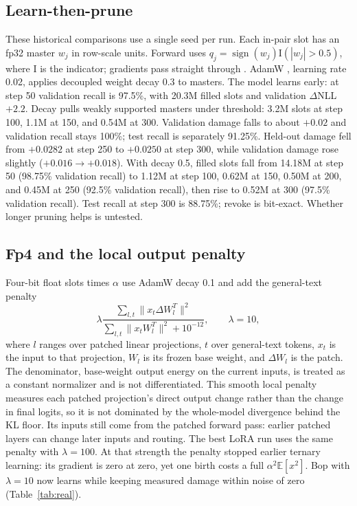 \documentclass[11pt]{article}
\begin{document}
\subsection{Learn-then-prune} These historical comparisons use a single seed per run. Each in-pair slot has an fp32 master $w_j$ in row-scale units. Forward uses
$q_j=\operatorname{sign}(w_j)\mathrm{I}(|w_j|>0.5)$, where $\mathrm{I}$ is the indicator; gradients pass straight through
\citep{ste}. AdamW \citep{adamw}, learning rate 0.02, applies decoupled weight decay 0.3 to masters.
The model learns early: at step 50 validation recall is 97.5\%, with 20.3M filled slots and validation
$\Delta$NLL $+2.2$. Decay pulls weakly supported masters under threshold: 3.2M slots at step 100,
1.1M at 150, and 0.54M at 300. Validation damage falls to about $+0.02$ and validation recall stays
100\%; test recall is separately 91.25\%. Held-out damage fell from $+0.0282$ at step 250 to
$+0.0250$ at step 300, while validation damage rose slightly ($+0.016 \to +0.018$).
With decay 0.5, filled slots fall from 14.18M at step 50 (98.75\% validation recall)
to 1.12M at step 100, 0.62M at 150, 0.50M at 200, and 0.45M at 250 (92.5\% validation recall),
then rise to 0.52M at 300 (97.5\% validation recall). Test recall at step 300 is 88.75\%;
revoke is bit-exact. Whether longer pruning helps is untested.
\par

\subsection{Fp4 and the local output penalty} Four-bit float slots times $\alpha$ use AdamW decay 0.1
and add the general-text penalty
\[
\lambda\frac{\sum_{l,t}\|x_t\Delta W_l^T\|^2}{\sum_{l,t}\|x_tW_l^T\|^2+10^{-12}},\qquad\lambda=10,
\]
where $l$ ranges over patched linear projections, $t$ over general-text tokens, $x_t$ is the input to
that projection, $W_l$ is its frozen base weight, and $\Delta W_l$ is the patch. The denominator,
base-weight output energy on the current inputs, is treated as a constant normalizer and is not
differentiated. This smooth local
penalty measures each patched projection's direct output change rather than the change in final
logits, so it is not dominated by the whole-model divergence behind the KL floor. Its inputs still come from the patched forward
pass: earlier patched layers can change later inputs and routing. The best LoRA run uses the same penalty
with $\lambda=100$. At that strength the penalty stopped earlier ternary learning: its gradient
is zero at zero, yet one birth costs a full $\alpha^2\mathbb{E}[x^2]$. Bop with $\lambda=10$
now learns while keeping measured damage within noise of zero (Table~\ref{tab:real}).
\par
\end{document}
